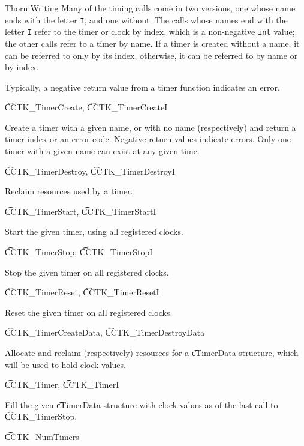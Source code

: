 \begin{cactuspart}{Thorn Writing}
Many of the timing calls come in two versions, one whose name ends with 
the letter \texttt{I}, and one without.  The calls whose names end with the 
letter \texttt{I} refer to the timer or clock by index, which is a
non-negative \texttt{int} value; the other calls refer to a timer by name. 
If a timer is created without a name, it can be referred to only by its index,
otherwise, it can be referred to by name or by index.

Typically, a negative return value from a timer function indicates an error.

\begin{Lentry}

\item[{\t CCTK\_TimerCreate}, {\t CCTK\_TimerCreateI}]

Create a timer with a given name, or with no name (respectively)
and return a timer index or an error code.
Negative return values indicate errors. 
Only one timer with a given name can exist at any given time.

\item[{\t CCTK\_TimerDestroy}, {\t CCTK\_TimerDestroyI}]

Reclaim resources used by a timer.

\item[{\t CCTK\_TimerStart}, {\t CCTK\_TimerStartI}]

Start the given timer, using all registered clocks.

\item[{\t CCTK\_TimerStop}, {\t CCTK\_TimerStopI}]

Stop the given timer on all registered clocks.

\item[{\t CCTK\_TimerReset}, {\t CCTK\_TimerResetI}]

Reset the given timer on all registered clocks.

\item[{\t CCTK\_TimerCreateData}, {\t CCTK\_TimerDestroyData}]

Allocate and reclaim (respectively) resources for a {\t cTimerData} structure,
which will be used to hold clock values.

\item[{\t CCTK\_Timer}, {\t CCTK\_TimerI}]

Fill the given {\t cTimerData} structure with clock values as of
the last call to {\t CCTK\_TimerStop}.

\item[{\t CCTK\_NumTimers}]


\end{Lentry}
\end{cactuspart}
